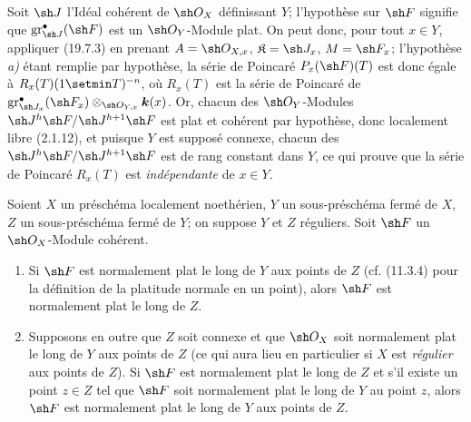 
Soit $\sh J$ l'Idéal cohérent de $\sh O_X$ définissant $Y$; l'hypothèse sur $\sh F$ signifie que $\operatorname{gr}_{\sh J}^\bullet(\sh F)$ est un $\sh O_Y$-Module plat. On peut donc, pour tout $x\in Y$, appliquer (19.7.3) en prenant $A=\sh O_{X,x}$, $\mathfrak K=\sh J_x$, $M=\sh F_x$; l'hypothèse \emph{a)} étant remplie par hypothèse, la série de Poincaré $P_x(\sh F)(T)$ est donc égale à $R_x(T)(1\setmin T)^{-n}$, où $R_x(T)$ est la série de Poincaré de $\operatorname{gr}_{\sh J_x}^\bullet(\sh F_x)\otimes_{\sh O_{Y,x}}\boldsymbol{k}(x)$. Or, chacun des $\sh O_Y$-Modules $\sh J^h\sh F/\sh J^{h+1}\sh F$ est plat et cohérent par hypothèse, donc localement libre (2.1.12), et puisque $Y$ est supposé connexe, chacun des $\sh J^h\sh F/\sh J^{h+1}\sh F$ est de rang constant dans $Y$, ce qui prouve que la série de Poincaré $R_x(T)$ est \emph{indépendante} de $x\in Y$.

\begin{corollary}[19.7.5]
\label{IV.19.7.5}
Soient $X$ un préschéma localement noethérien, $Y$ un sous-préschéma fermé de $X$, $Z$ un sous-préschéma fermé de $Y$; on suppose $Y$ et $Z$ réguliers. Soit $\sh F$ un $\sh O_X$-Module cohérent.
\begin{enumerate}
  \item[\textup{(i)}] Si $\sh F$ est normalement plat le long de $Y$ aux points de $Z$ \textup{(cf. (11.3.4) pour la définition de la platitude normale en un point)}, alors $\sh F$ est normalement plat le long de $Z$.
  \item[\textup{(ii)}] Supposons en outre que $Z$ soit connexe et que $\sh O_X$ soit normalement plat le long de $Y$ aux points de $Z$ \textup{(ce qui aura lieu en particulier si $X$ est \emph{régulier} aux points de $Z$)}. Si $\sh F$ est normalement plat le long de $Z$ et s'il existe \textup{un} point $z\in Z$ tel que $\sh F$ soit normalement plat le long de $Y$ au point $z$, alors $\sh F$ est normalement plat le long de $Y$ aux points de $Z$.
\end{enumerate}
\end{corollary}

